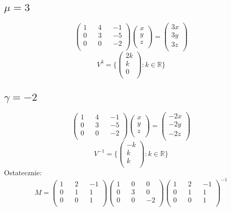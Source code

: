 \documentclass{article}
\begin{document}
\subsection*{$\mu = 3$}
$$
\begin{pmatrix}
1 && 4 && -1\\
0 && 3 && -5\\
0 && 0 && -2\\
\end{pmatrix}
\begin{pmatrix}
x\\
y\\
z\\
\end{pmatrix} =
\begin{pmatrix}
3x\\
3y\\
3z\\
\end{pmatrix}
$$
$$
V^{3} = \{\begin{pmatrix}
2k\\
k\\
0\\
\end{pmatrix} : k \in \mathbb{R}\}
$$
\subsection*{$\gamma = -2$}
$$
\begin{pmatrix}
1 && 4 && -1\\
0 && 3 && -5\\
0 && 0 && -2\\
\end{pmatrix}
\begin{pmatrix}
x\\
y\\
z\\
\end{pmatrix} =
\begin{pmatrix}
-2x\\
-2y\\
-2z\\
\end{pmatrix}
$$
$$
V^{-1} = \{\begin{pmatrix}
-k\\
k\\
k\\
\end{pmatrix} : k \in \mathbb{R}\}
$$
Ostatecznie:
$$
M =
\begin{pmatrix}
1 && 2 && -1\\
0 && 1 && 1\\
0 && 0 && 1\\
\end{pmatrix}
\begin{pmatrix}
1 && 0 && 0\\
0 && 3 && 0\\
0 && 0 && -2\\
\end{pmatrix}
\begin{pmatrix}
1 && 2 && -1\\
0 && 1 && 1\\
0 && 0 && 1\\
\end{pmatrix}^{-1}
$$
\end{document}

